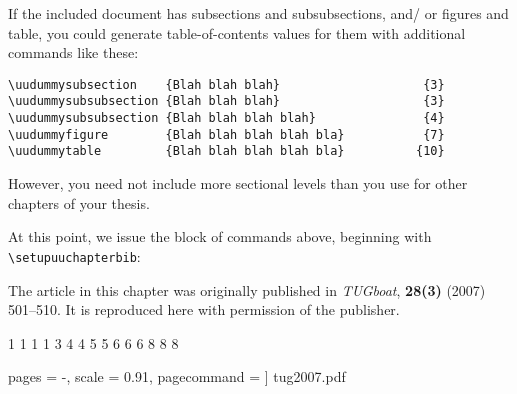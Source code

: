 If the included document has subsections and subsubsections, and\slash
or figures and table, you could generate table-of-contents values for
them with additional commands like these:
%
\begin{verbatim}
\uudummysubsection    {Blah blah blah}                    {3}
\uudummysubsubsection {Blah blah blah}                    {3}
\uudummysubsubsection {Blah blah blah blah}               {4}
\uudummyfigure        {Blah blah blah blah bla}           {7}
\uudummytable         {Blah blah blah blah bla}          {10}
\end{verbatim}

However, you need not include more sectional levels than you
use for other chapters of your thesis.

At this point, we issue the block of commands above,
beginning with \verb=\setupuuchapterbib=:

\setupuuchapterbib

The article in this chapter was originally published in
\emph{TUGboat}, {\bf 28(3)} (2007) 501--510.  It is reproduced
here with permission of the publisher.

                              {1}
                            {1}
       {1}
                      {1}
       {3}
 {4}
           {4}
    {5}
                   {5}
       {6}
     {6}
      {6}
                 {8}
                                 {8}
                              {8}


                pages = -,          %
                scale = 0.91,       %
                pagecommand = {\pagestyle{plain}} %
            ]
            {tug2007.pdf}
